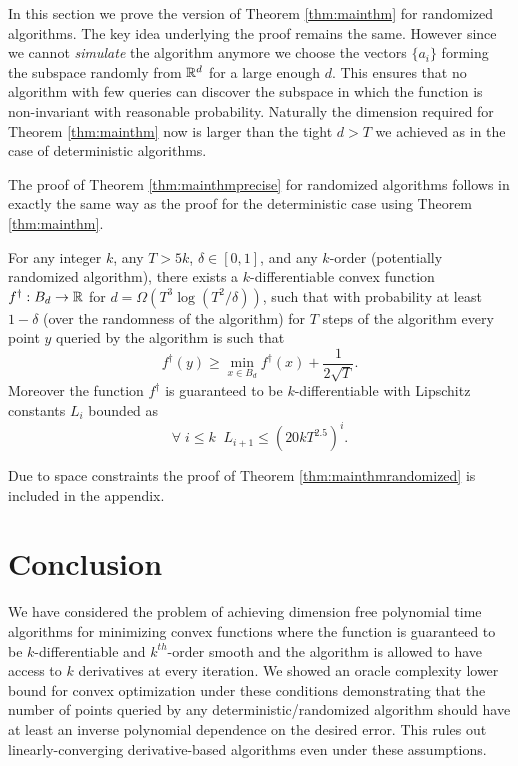 \documentclass[final,12pt]{colt2018} %
\def\hardf{f^{\dagger}}
\begin{document}
\label{sec:randomized}



In this section we prove the version of Theorem \ref{thm:mainthm} for randomized algorithms. The key idea underlying the proof remains the same. However since we cannot \textit{simulate} the algorithm anymore we choose the vectors $\{a_i\}$ forming the subspace randomly from ${\mathbb R}^d$ for a large enough $d$. This ensures that no algorithm with few queries can discover the subspace in which the function is non-invariant with reasonable probability. Naturally the dimension required for Theorem \ref{thm:mainthm} now is larger than the tight $d > T$ we achieved as in the case of deterministic algorithms.

The proof of Theorem \ref{thm:mainthmprecise} for randomized algorithms follows in exactly the same way as the proof for the deterministic case using Theorem \ref{thm:mainthm}. 

\begin{theorem}
\label{thm:mainthmrandomized}
  For any integer $k$, any $T > 5k$, $\delta \in [0,1]$,  and any $k$-order (potentially randomized algorithm), there exists a $k$-differentiable convex function $\hardf: B_d \rightarrow \reals$ for $d = \Omega(T^3\log(T^2/\delta))$, such that with probability at least $1 - \delta$ (over the randomness of the algorithm) for $T$ steps of the algorithm every point $y$ queried by the algorithm is such that 
   \[\hardf(y) \geq \min_{x \in B_d}\hardf(x) + \frac{1}{2\sqrt{T}}.\] 
   Moreover the function $\hardf$ is guaranteed to be $k$-differentiable with Lipschitz constants $L_i$ bounded as 
  \[ \forall \;i \leq k \;\; L_{i+1} \leq (20kT^{2.5})^i.\]
\end{theorem}
\noindent Due to space constraints the proof of Theorem \ref{thm:mainthmrandomized} is included in the appendix.

\section{Conclusion}

We have considered the problem of achieving dimension free polynomial time algorithms for minimizing convex functions where the function is guaranteed to be $k$-differentiable and $k^{th}$-order smooth and the algorithm is allowed to have access to $k$ derivatives at every iteration. We showed an oracle complexity lower bound for convex optimization under these conditions demonstrating that the number of points queried by any deterministic/randomized algorithm should have at least an inverse polynomial dependence on the desired error. This rules out linearly-converging derivative-based algorithms even under these assumptions. 
\end{document}
